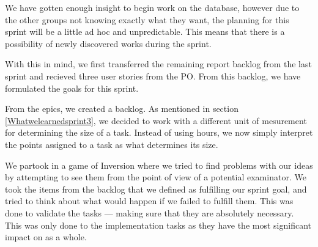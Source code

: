 We have gotten enough insight to begin work on the database, however due to the other groups not knowing exactly what they want, the planning for this sprint will be a little ad hoc and unpredictable.  
This means that there is a possibility of newly discovered works during the sprint.

With this in mind, we first transferred the remaining report backlog from the last sprint and recieved three user stories from the PO. 
From this backlog, we have formulated the goals for this sprint.

From the epics, we created a backlog. As mentioned in section \ref{Whatwelearnedsprint3}, we decided to work with a different unit of mesurement for determining the size of a task.
Instead of using hours, we now simply interpret the points assigned to a task as what determines its size.

We partook in a game of Inversion  where we tried to find problems with our ideas by attempting to see them from the point of view of a potential examinator. 
We took the items from the backlog that we defined as fulfilling our sprint goal, and tried to think about what would happen if we failed to fulfill them. 
This was done to validate the tasks — making sure that they are absolutely necessary. 
This was only done to the implementation tasks as they have the most significant impact on \knox{} as a whole.
